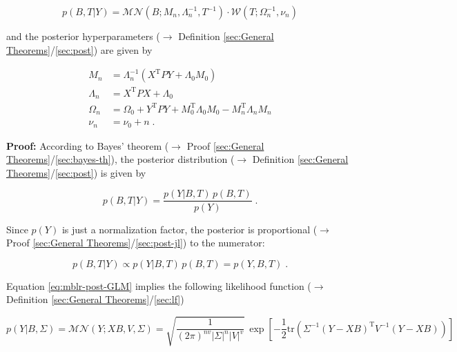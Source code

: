 \documentclass[a4paper,12pt,twoside]{book}
\begin{document}
\begin{equation} \label{eq:mblr-post-GLM-NW-post}
p(B,T|Y) = \mathcal{MN}(B; M_n, \Lambda_n^{-1}, T^{-1}) \cdot \mathcal{W}(T; \Omega_n^{-1}, \nu_n)
\end{equation}

and the posterior hyperparameters ($\rightarrow$ Definition \ref{sec:General Theorems}/\ref{sec:post}) are given by

\begin{equation} \label{eq:mblr-post-GLM-NW-post-par}
\begin{split}
M_n &= \Lambda_n^{-1} (X^\mathrm{T} P Y + \Lambda_0 M_0) \\
\Lambda_n &= X^\mathrm{T} P X + \Lambda_0 \\
\Omega_n &= \Omega_0 + Y^\mathrm{T} P Y + M_0^\mathrm{T} \Lambda_0 M_0 - M_n^\mathrm{T} \Lambda_n M_n \\
\nu_n &= \nu_0 + n \; .
\end{split}
\end{equation}


\vspace{1em}
\textbf{Proof:} According to Bayes' theorem ($\rightarrow$ Proof \ref{sec:General Theorems}/\ref{sec:bayes-th}), the posterior distribution ($\rightarrow$ Definition \ref{sec:General Theorems}/\ref{sec:post}) is given by

\begin{equation} \label{eq:mblr-post-GLM-NG-BT}
p(B,T|Y) = \frac{p(Y|B,T) \, p(B,T)}{p(Y)} \; .
\end{equation}

Since $p(Y)$ is just a normalization factor, the posterior is proportional ($\rightarrow$ Proof \ref{sec:General Theorems}/\ref{sec:post-jl}) to the numerator:

\begin{equation} \label{eq:mblr-post-GLM-NG-post-JL}
p(B,T|Y) \propto p(Y|B,T) \, p(B,T) = p(Y,B,T) \; .
\end{equation}

Equation \eqref{eq:mblr-post-GLM} implies the following likelihood function ($\rightarrow$ Definition \ref{sec:General Theorems}/\ref{sec:lf})

\begin{equation} \label{eq:mblr-post-GLM-LF-Class}
p(Y|B,\Sigma) = \mathcal{MN}(Y; X B, V, \Sigma) = \sqrt{\frac{1}{(2 \pi)^{nv} |\Sigma|^n |V|^v}} \, \exp\left[ -\frac{1}{2} \mathrm{tr}\left( \Sigma^{-1} (Y-XB)^\mathrm{T} V^{-1} (Y-XB) \right) \right]
\end{equation}
\end{document}
